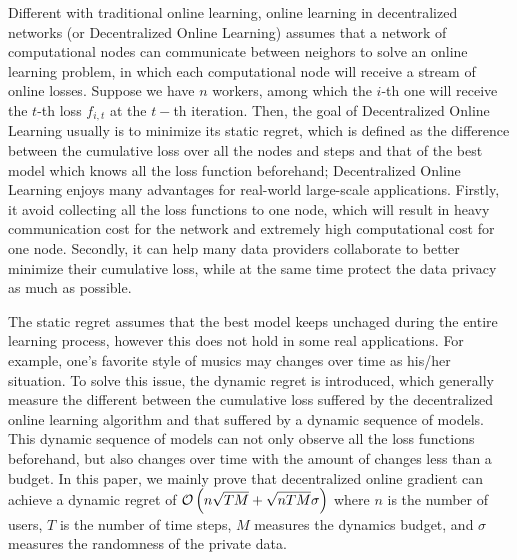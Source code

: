 \documentclass{article}
\begin{document}
Different with traditional online learning, online learning in decentralized networks (or Decentralized Online Learning) assumes that a network of computational nodes can communicate between neighors to solve an online learning problem, in which each computational node will receive a stream of online losses. Suppose we have $n$ workers, among which the $i$-th one will receive the $t$-th loss $f_{i,t}$ at the $t-$th iteration. Then, the goal of Decentralized Online Learning usually is to minimize its static regret, which is defined as the difference between the cumulative loss over all the nodes and steps and that of the best model which knows all the loss function beforehand; Decentralized Online Learning enjoys many advantages for real-world large-scale applications. Firstly, it avoid collecting all the loss functions to one node, which will result in heavy communication cost for the network and extremely high computational cost for one node. Secondly, it can help many data providers collaborate to better minimize their cumulative loss, while at the same time protect the data privacy as much as possible. 

The static regret assumes that the best model keeps unchaged during the entire learning process, however this does not hold in some real applications. For example, one's favorite style of musics may changes over time as his/her situation. To solve this issue, the dynamic regret is introduced, which generally measure the different between the cumulative loss suffered by the decentralized online learning algorithm and that suffered by a dynamic sequence of models. This dynamic sequence of models can not only observe all the loss functions beforehand, but also changes over time with the amount of changes less than a budget. In this paper, we mainly prove that decentralized online gradient can achieve a dynamic regret  of ${\mathcal{O}\left( n\sqrt{TM} + \sqrt{nTM}\sigma \right)}$ where $n$ is the number of users, $T$ is the number of time steps, $M$ measures the dynamics budget, and $\sigma$ measures the randomness of the private data. 
\end{document}
